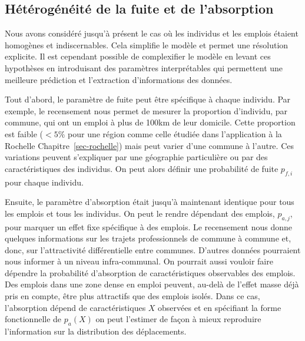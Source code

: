 \documentclass[
  10pt,
  a4paper,
  numbers=noendperiod,
  DIV=9]{scrreprt}
\begin{document}
\hypertarget{sec-hetero}{%
\subsection{Hétérogénéité de la fuite et de
l'absorption}\label{sec-hetero}}

Nous avons considéré jusqu'à présent le cas où les individus et les
emplois étaient homogènes et indiscernables. Cela simplifie le modèle et
permet une résolution explicite. Il est cependant possible de
complexifier le modèle en levant ces hypothèses en introduisant des
paramètres interprétables qui permettent une meilleure prédiction et
l'extraction d'informations des données.

Tout d'abord, le paramètre de fuite peut être spécifique à chaque
individu. Par exemple, le recensement nous permet de mesurer la
proportion d'individu, par commune, qui ont un emploi à plus de 100km de
leur domicile. Cette proportion est faible (\(<5\%\) pour une région
comme celle étudiée dans l'application à la Rochelle
Chapitre~\ref{sec-rochelle}) mais peut varier d'une commune à l'autre.
Ces variations peuvent s'expliquer par une géographie particulière ou
par des caractéristiques des individus. On peut alors définir une
probabilité de fuite \(p_{f,i}\) pour chaque individu.

Ensuite, le paramètre d'absorption était jusqu'à maintenant identique
pour tous les emplois et tous les individus. On peut le rendre dépendant
des emplois, \(p_{a,j}\), pour marquer un effet fixe spécifique à des
emplois. Le recensement nous donne quelques informations sur les trajets
professionnels de commune à commune et, donc, sur l'attractivité
différentielle entre communes. D'autres données pourraient nous informer
à un niveau infra-communal. On pourrait aussi vouloir faire dépendre la
probabilité d'absorption de caractéristiques observables des emplois.
Des emplois dans une zone dense en emploi peuvent, au-delà de l'effet
masse déjà pris en compte, être plus attractifs que des emplois isolés.
Dans ce cas, l'absorption dépend de caractéristiques \(X\) observées et
en spécifiant la forme fonctionnelle de \(p_a(X)\) on peut l'estimer de
façon à mieux reproduire l'information sur la distribution des
déplacements.
\end{document}

